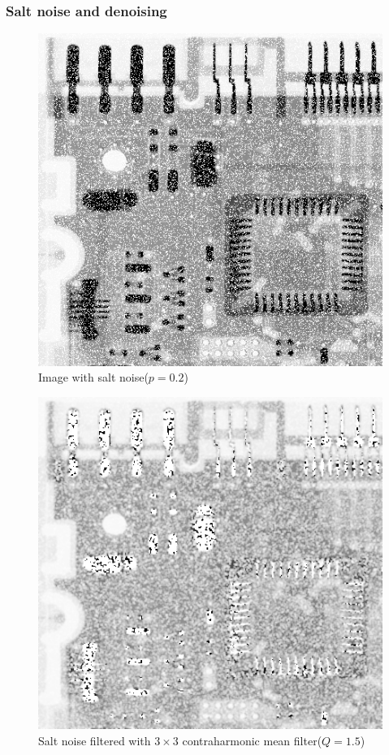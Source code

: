 \documentclass{article}
\begin{document}
\subsubsection{Salt noise and denoising}


\begin{figure}[H]
	\centering
	\includegraphics[width=336pt]{../result/task2/salt/salt-20.png}
	\caption{Image with salt noise($p=0.2$)}
	\label{fig:salt}
\end{figure}

\begin{figure}[H]
	\centering
	\includegraphics[width=336pt]{../result/task2/salt/salt-contraharmonic-1-5.png}
	\caption{Salt noise filtered with $3 \times 3$ contraharmonic mean filter($Q = 1.5$)}
	\label{fig:saltchmpos}
\end{figure}
\end{document}
